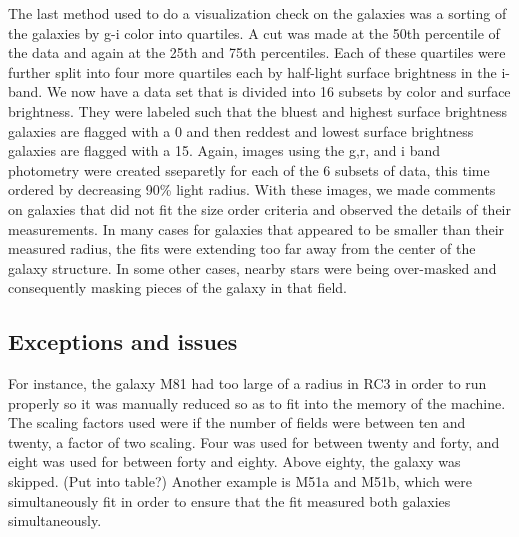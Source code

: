 \documentclass[12pt,preprint,pdftex]{aastex}
\begin{document}
The last method used to do a visualization check on the galaxies was a sorting of the galaxies by g-i color into quartiles. A cut was made at the 50th percentile of the data and again at the 25th and 75th percentiles. Each of these quartiles were further split into four more quartiles each by half-light surface brightness in the i-band. We now have a data set that is divided into 16 subsets by color and surface brightness. They were labeled such that the bluest and highest surface brightness galaxies are flagged with a 0 and then reddest and lowest surface brightness galaxies are flagged with a 15. Again, images using the g,r, and i band photometry were created sseparetly for each of the 6 subsets of data, this time ordered by decreasing 90\% light radius. With these images, we made comments on galaxies that did not fit the size order criteria and observed the details of their measurements. In many cases for galaxies that appeared to be smaller than their measured radius, the fits were extending too far away from the center of the galaxy structure. In some other cases, nearby stars were being over-masked and consequently masking pieces of the galaxy in that field. 





\subsection{Exceptions and issues}\label{sec:results}
For instance, the galaxy M81 had too large of a radius in RC3 in order to run properly so it was manually reduced so as to fit into the memory of the machine. The scaling factors used were if the number of fields were between ten and twenty, a factor of two scaling. Four was used for between twenty and forty, and eight was used for between forty and eighty. Above eighty, the galaxy was skipped. (Put into table?) Another example is M51a and M51b, which were simultaneously fit in order to ensure that the fit measured both galaxies simultaneously. 
\end{document}
